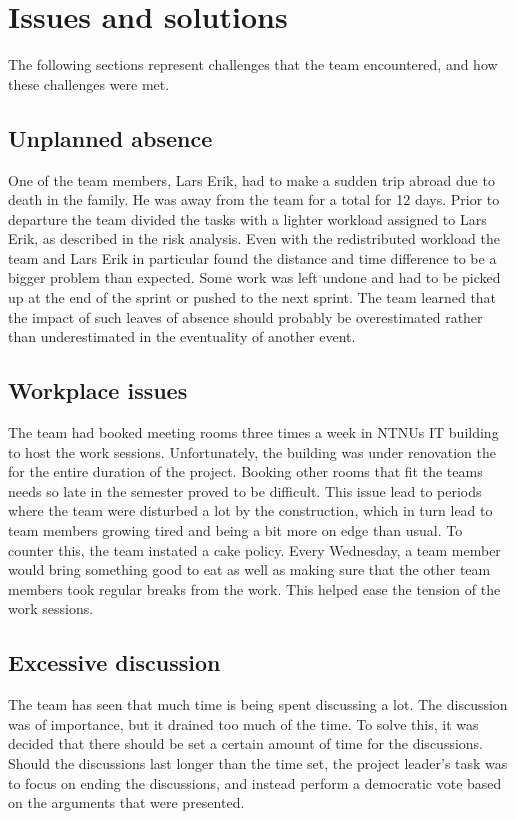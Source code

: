 \section{Issues and solutions}
The following sections represent challenges that the team encountered, and how these challenges were met.

\subsection{Unplanned absence}
One of the team members, Lars Erik, had to make a sudden trip abroad due to
death in the family. He was away from the team for a total for 12 days. Prior
to departure the team divided the tasks with a lighter workload assigned to Lars
Erik, as described in the risk analysis. Even with the redistributed workload
the team and Lars Erik in particular found the distance and time difference to
be a bigger problem than expected. Some work was left undone and had to be
picked up at the end of the sprint or pushed to the next sprint. The team
learned that the impact of such leaves of absence should probably be
overestimated rather than underestimated in the eventuality of another event.

\subsection{Workplace issues}
The team had booked meeting rooms three times a week in NTNUs IT building to host the work sessions. Unfortunately, the building was under renovation the for the entire duration of the project. Booking other rooms that fit the teams needs so late in the semester proved to be difficult. This issue lead to periods where the team were disturbed a lot by the construction, which in turn lead to team members growing tired and being a bit more on edge than usual. To counter this, the team instated a cake policy. Every Wednesday, a team member would bring something good to eat as well as making sure that the other team members took regular breaks from the work. This helped ease the tension of the work sessions.


\subsection{Excessive discussion}
The team has seen that much time is being spent discussing a lot. The discussion was of importance, but it drained too much of the time. To solve this, it was decided that there should be set a certain amount of time for the discussions. Should the discussions last longer than the time set, the project leader's task was to focus on ending the discussions, and instead perform a democratic vote based on the arguments that were presented. 

